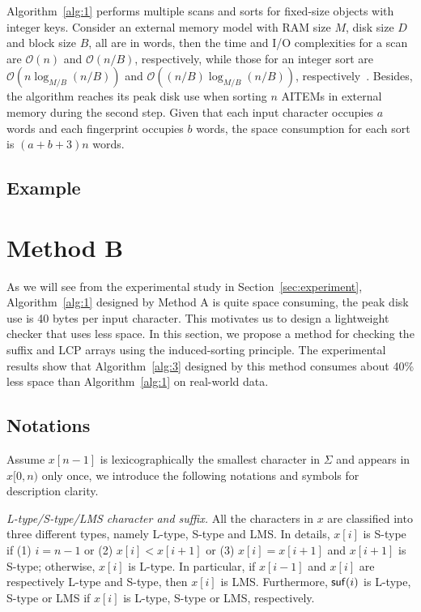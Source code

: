 \documentclass[10pt,journal,compsoc]{IEEEtran}
\begin{document}
	Algorithm~\ref{alg:1} performs multiple scans and sorts for fixed-size objects with integer keys.	Consider an external memory model with RAM size $M$, disk size $D$ and block size $B$, all are in words, then the time and I/O complexities for a scan are $\mathcal{O}(n)$ and $\mathcal{O}(n / B)$, respectively, while those for an integer sort are $\mathcal{O}(n\log_{M/ B}(n / B))$ and $\mathcal{O}((n / B)\log_{M / B}(n / B))$, respectively~\cite{Arge2013}. Besides, the algorithm reaches its peak disk use when sorting $n$ AITEMs in external memory during the second step. Given that each input character occupies $a$ words and each fingerprint occupies $b$ words, the space consumption for each sort is $(a + b + 3)n$ words.
	
	\subsection{Example} \label{sec:method1:example}
	
	
	\section{Method B} \label{sec:method2}
	
	As we will see from the experimental study in Section~\ref{sec:experiment}, Algorithm~\ref{alg:1} designed by Method A is quite space consuming, the peak disk use is 40 bytes per input character. This motivates us to design a lightweight checker that uses less space. In this section, we propose a method for checking the suffix and LCP arrays using the induced-sorting principle. The experimental results show that Algorithm~\ref{alg:3} designed by this method consumes about 40\% less space than Algorithm~\ref{alg:1} on real-world data.
	
	\subsection{Notations} \label{sec:algorithm2:notations}
	
	Assume $x[n - 1]$ is lexicographically the smallest character in $\Sigma$ and appears in $x[0, n)$ only once, we introduce the following notations and symbols for description clarity.
	
	{\em L-type/S-type/LMS character and suffix.} All the characters in $x$ are classified into three different types, namely L-type, S-type and LMS. In details, $x[i]$ is S-type if (1) $i = n - 1$ or (2) $x[i] < x[i + 1]$ or (3) $x[i] = x[i+1]$ and $x[i+1]$ is S-type; otherwise, $x[i]$ is L-type. In particular, if $x[i - 1]$ and $x[i]$ are respectively L-type and S-type, then $x[i]$ is LMS. Furthermore, ${\sf suf}(i)$ is L-type, S-type or LMS if $x[i]$ is L-type, S-type or LMS, respectively.
	
\end{document}
